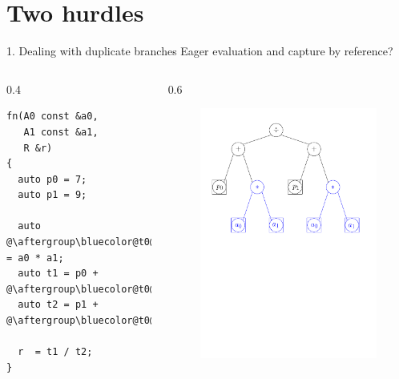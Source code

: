 \documentclass[xcolor=dvipsnames]{beamer}
\begin{document}
\section{Two hurdles}

\begin{frame}[fragile]{1. Dealing with duplicate branches}
Eager evaluation and capture by reference?
  \begin{columns}[T] %
    \begin{column}{0.4\textwidth}
        \begin{lstlisting}
fn(A0 const &a0,
   A1 const &a1,
   R &r)
{
  auto p0 = 7;
  auto p1 = 9;

  auto @\aftergroup\bluecolor@t0@\aftergroup\blackcolor@ = a0 * a1;
  auto t1 = p0 + @\aftergroup\bluecolor@t0@\aftergroup\blackcolor@;
  auto t2 = p1 + @\aftergroup\bluecolor@t0@\aftergroup\blackcolor@;

  r  = t1 / t2;
}
  \end{lstlisting}
    \end{column}%
    \hfill%
    \begin{column}{0.6\textwidth}
\begin{figure}[H]
 \centering
 \includegraphics[width=0.99\textwidth]{fig_exprtree_dup}
\end{figure}
    \end{column}%
  \end{columns}
\end{frame}
\end{document}
